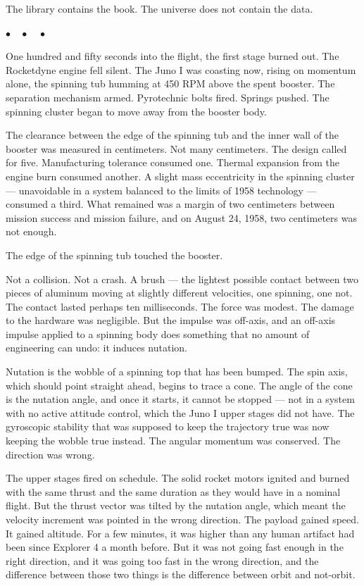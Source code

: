 \documentclass[12pt, letterpaper]{article}
\begin{document}
The library contains the book. The universe does not contain the data.

\begin{center}
$\bullet\quad\bullet\quad\bullet$
\end{center}

One hundred and fifty seconds into the flight, the first stage burned out. The Rocketdyne engine fell silent. The Juno I was coasting now, rising on momentum alone, the spinning tub humming at 450 RPM above the spent booster. The separation mechanism armed. Pyrotechnic bolts fired. Springs pushed. The spinning cluster began to move away from the booster body.

The clearance between the edge of the spinning tub and the inner wall of the booster was measured in centimeters. Not many centimeters. The design called for five. Manufacturing tolerance consumed one. Thermal expansion from the engine burn consumed another. A slight mass eccentricity in the spinning cluster --- unavoidable in a system balanced to the limits of 1958 technology --- consumed a third. What remained was a margin of two centimeters between mission success and mission failure, and on August 24, 1958, two centimeters was not enough.

The edge of the spinning tub touched the booster.

Not a collision. Not a crash. A brush --- the lightest possible contact between two pieces of aluminum moving at slightly different velocities, one spinning, one not. The contact lasted perhaps ten milliseconds. The force was modest. The damage to the hardware was negligible. But the impulse was off-axis, and an off-axis impulse applied to a spinning body does something that no amount of engineering can undo: it induces nutation.

Nutation is the wobble of a spinning top that has been bumped. The spin axis, which should point straight ahead, begins to trace a cone. The angle of the cone is the nutation angle, and once it starts, it cannot be stopped --- not in a system with no active attitude control, which the Juno I upper stages did not have. The gyroscopic stability that was supposed to keep the trajectory true was now keeping the wobble true instead. The angular momentum was conserved. The direction was wrong.

The upper stages fired on schedule. The solid rocket motors ignited and burned with the same thrust and the same duration as they would have in a nominal flight. But the thrust vector was tilted by the nutation angle, which meant the velocity increment was pointed in the wrong direction. The payload gained speed. It gained altitude. For a few minutes, it was higher than any human artifact had been since Explorer 4 a month before. But it was not going fast enough in the right direction, and it was going too fast in the wrong direction, and the difference between those two things is the difference between orbit and not-orbit.
\end{document}
